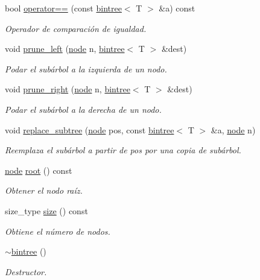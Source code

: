 \begin{DoxyCompactItemize}
bool \hyperlink{classbintree_a29438cd817b1d27ccc10d46676ba6bef}{operator==} (const \hyperlink{classbintree}{bintree}$<$ T $>$ \&a) const 
\begin{DoxyCompactList}\small\item\em Operador de comparación de igualdad. \end{DoxyCompactList}\item 
void \hyperlink{classbintree_a74b4b7570b9b574391742f892520562b}{prune\+\_\+left} (\hyperlink{classbintree_1_1node}{node} n, \hyperlink{classbintree}{bintree}$<$ T $>$ \&dest)
\begin{DoxyCompactList}\small\item\em Podar el subárbol a la izquierda de un nodo. \end{DoxyCompactList}\item 
void \hyperlink{classbintree_ae468b92dd3eb70818ffbd969ff34d811}{prune\+\_\+right} (\hyperlink{classbintree_1_1node}{node} n, \hyperlink{classbintree}{bintree}$<$ T $>$ \&dest)
\begin{DoxyCompactList}\small\item\em Podar el subárbol a la derecha de un nodo. \end{DoxyCompactList}\item 
void \hyperlink{classbintree_a75647277e4d20981651450e86ffad165}{replace\+\_\+subtree} (\hyperlink{classbintree_1_1node}{node} pos, const \hyperlink{classbintree}{bintree}$<$ T $>$ \&a, \hyperlink{classbintree_1_1node}{node} n)
\begin{DoxyCompactList}\small\item\em Reemplaza el subárbol a partir de pos por una copia de subárbol. \end{DoxyCompactList}\item 
\hyperlink{classbintree_1_1node}{node} \hyperlink{classbintree_aa5d9c32204880ba5df3b31836d8720da}{root} () const 
\begin{DoxyCompactList}\small\item\em Obtener el nodo raíz. \end{DoxyCompactList}\item 
size\+\_\+type \hyperlink{classbintree_a05abb18037587082a67fb4d4d2f5733f}{size} () const 
\begin{DoxyCompactList}\small\item\em Obtiene el número de nodos. \end{DoxyCompactList}\item 
\hyperlink{classbintree_a7f32fcbdc9aed453025a13cbe93e3b89}{$\sim$bintree} ()
\begin{DoxyCompactList}\small\item\em Destructor. \end{DoxyCompactList}\end{DoxyCompactItemize}
